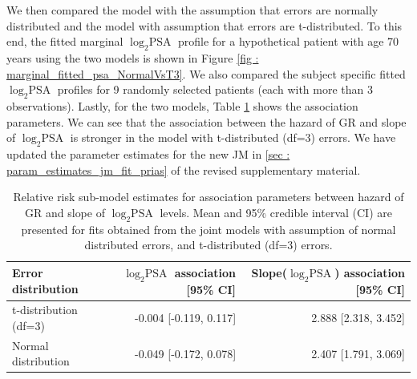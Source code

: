 \begin{enumerate}
	We then compared the model with the assumption that errors are normally distributed and the model with assumption that errors are t-distributed. To this end, the fitted marginal $\log_2 \mbox{PSA}$ profile for a hypothetical patient with age 70 years using the two models is shown in Figure \ref{fig : marginal_fitted_psa_NormalVsT3}. We also compared the subject specific fitted $\log_2 \mbox{PSA}$ profiles for 9 randomly selected patients (each with more than 3 observations). Lastly, for the two models, Table \ref{tab : relative_risk_comparison} shows the association parameters. We can see that the association between the hazard of GR and slope of $\log_2 \mbox{PSA}$ is stronger in the model with t-distributed (df=3) errors. We have updated the parameter estimates for the new JM in \ref{sec : param_estimates_jm_fit_prias} of the revised supplementary material.

	\begin{table}[!htb]
	\begin{center}
	\caption{Relative risk sub-model estimates for association parameters between hazard of GR and slope of $\log_2 \mbox{PSA}$ levels. Mean and 95\% credible interval (CI) are presented for fits obtained from the joint models with assumption of normal distributed errors, and t-distributed (df=3) errors.}
	\label{tab : relative_risk_comparison}
	\begin{tabular}{lrr}
	\Hline
	Error distribution                      & $\log_2 \mbox{PSA}$ association [95\% CI]   & Slope($\log_2 \mbox{PSA}$) association [95\% CI]\\ 
	\hline
	t-distribution (df=3)                  & -0.004 [-0.119, 0.117] & 2.888 [2.318, 3.452] \\
	Normal distribution                    & -0.049 [-0.172, 0.078] & 2.407 [1.791, 3.069] \\
	\hline
	\end{tabular}	
	\end{center}
	\end{table}


\end{enumerate}

